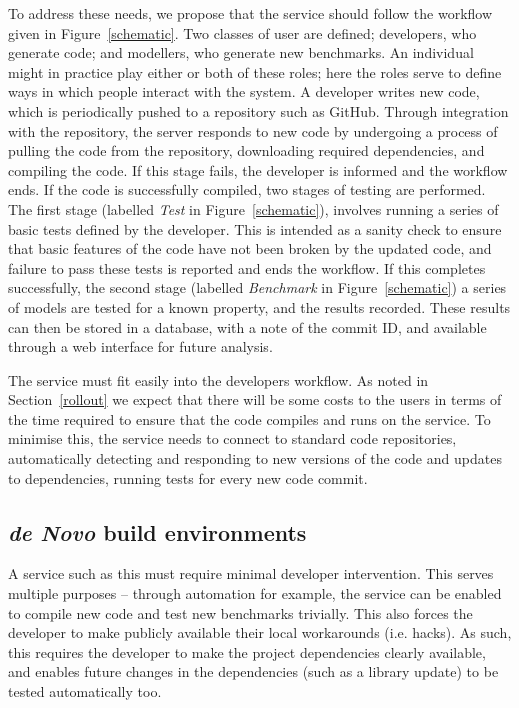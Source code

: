 \documentclass[conference]{IEEEtran}
\begin{document}
To address these needs, we propose that the service should follow the
workflow given in Figure~\ref{schematic}. Two classes of user are
defined; developers, who generate code; and modellers, who generate
new benchmarks. An individual might in practice play either or both of
these roles; here the roles serve to define ways in which people
interact with the system. A developer writes new code, which is
periodically pushed to a repository such as GitHub. Through
integration with the repository, the server responds to new code by
undergoing a process of pulling the code from the repository,
downloading required dependencies, and compiling the code. If this
stage fails, the developer is informed and the workflow ends. If the
code is successfully compiled, two stages of testing are
performed. The first stage (labelled {\emph{Test}} in
Figure~\ref{schematic}), involves running a series of basic tests
defined by the developer. This is intended as a sanity check to ensure
that basic features of the code have not been broken by the updated
code, and failure to pass these tests is reported and ends the
workflow. If this completes successfully, the second stage (labelled
{\emph{Benchmark}} in Figure~\ref{schematic}) a series of models are
tested for a known property, and the results recorded. These results
can then be stored in a database, with a note of the commit ID, and
available through a web interface for future analysis.

The service must fit easily into the developers workflow. As
noted in Section~\ref{rollout} we expect that there will be some costs
to the users in terms of the time required to ensure that the code
compiles and runs on the service. To minimise this, the service needs
to connect to standard code repositories, automatically detecting and
responding to new versions of the code and updates to dependencies,
running tests for every new code commit.

\subsection{{\em de Novo} build environments}

A service such as this must require minimal developer intervention.
This serves multiple purposes -- through automation for example, the
service can be enabled to compile new code and test new benchmarks
trivially. This also forces the developer to make publicly available
their local workarounds (i.e. hacks). As such, this requires the
developer to make the project dependencies clearly available, and
enables future changes in the dependencies (such as a library update)
to be tested automatically too.
\end{document}
